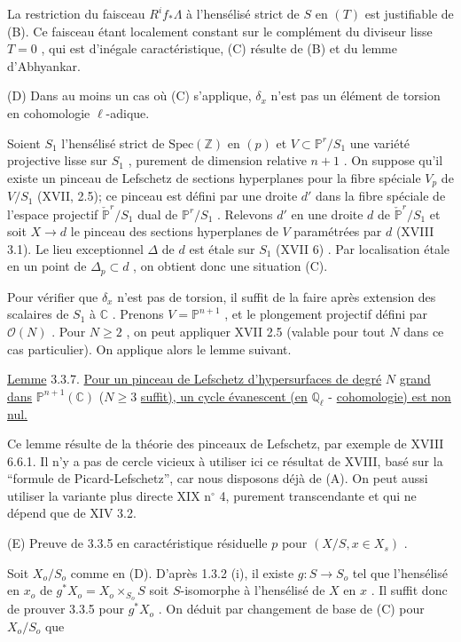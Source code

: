La restriction du faisceau $R^i f_* \Lambda$ à l'hensélisé strict de $S$ en $(T)$ est justifiable de (B). Ce faisceau étant localement constant sur le complément du diviseur lisse $T = 0$ , qui est d'inégale caractéristique, (C) résulte de (B) et du lemme d'Abhyankar.

(D) Dans au moins un cas où (C) s'applique, $\delta_x$ n'est pas un élément de torsion en cohomologie $\ell$-adique.



Soient $S_1$ l'hensélisé strict de $\mathrm{Spec}(\mathbb{Z})$ en $(p)$ et $V \subset \mathbb{P}^r/S_1$ une variété projective lisse sur $S_1$ , purement de dimension relative $n+1$ . On suppose qu'il existe un pinceau de Lefschetz de sections hyperplanes pour la fibre spéciale $V_p$ de $V/S_1$ (XVII, 2.5); ce pinceau est défini par une droite $d'$ dans la fibre spéciale de l'espace projectif $\check{\mathbb{P}}^r/S_1$ dual de $\mathbb{P}^r/S_1$ . Relevons $d'$ en une droite $d$ de $\check{\mathbb{P}}^r/S_1$ et soit $X \to d$ le pinceau des sections hyperplanes de $V$ paramétrées par $d$ (XVIII 3.1). Le lieu exceptionnel $\Delta$ de $d$ est étale sur $S_1$ (XVII 6) . Par localisation étale en un point de $\Delta_p \subset d$ , on obtient donc une situation (C).

Pour vérifier que $\delta_x$ n'est pas de torsion, il suffit de la faire après extension des scalaires de $S_1$ à $\mathbb{C}$ . Prenons $V = \mathbb{P}^{n+1}$ , et le plongement projectif défini par $\mathcal{O}(N)$ . Pour $N \geq 2$ , on peut appliquer XVII 2.5 (valable pour tout $N$ dans ce cas particulier). On applique alors le lemme suivant.

\underline{Lemme} 3.3.7. \underline{Pour un pinceau de Lefschetz d'hypersurfaces de degré} $N$ \underline{grand dans} $\mathbb{P}^{n+1}(\mathbb{C})$ ($N \geq 3$ \underline{suffit), un cycle évanescent (en} $\mathbb{Q}_{\ell}$ - \underline{cohomologie) est non nul.}

Ce lemme résulte de la théorie des pinceaux de Lefschetz, par exemple de XVIII 6.6.1. Il n'y a pas de cercle vicieux à utiliser ici ce résultat de XVIII, basé sur la ``formule de Picard-Lefschetz'', car nous disposons déjà de (A). On peut aussi utiliser la variante plus directe XIX n$^{\circ}$ 4, purement transcendante et qui ne dépend que de XIV 3.2.

(E) Preuve de 3.3.5 en caractéristique résiduelle $p$ pour $(X/S, x \in X_s)$ .

Soit $X_o/S_o$ comme en (D). D'après 1.3.2 (i), il existe $g : S \to S_o$ tel que l'hensélisé en $x_o$ de $g^{*}X_o = X_o \times_{S_o} S$ soit $S$-isomorphe à l'hensélisé de $X$ en $x$ . Il suffit donc de prouver 3.3.5 pour $g^{*}X_o$ . On déduit par changement de base de (C) pour $X_o/S_o$ que

